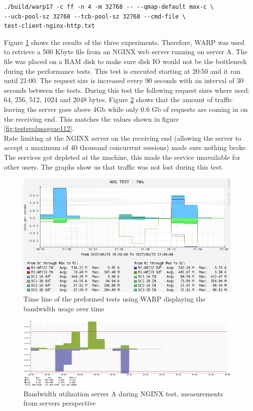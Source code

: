 \begin{verbatim}
./build/warp17 -c ff -n 4 -m 32768 -- --qmap-default max-c \
--ucb-pool-sz 32768 --tcb-pool-sz 32768 --cmd-file \
test-client-nginx-http.txt 
\end{verbatim} 

Figure \ref{fig:warptime} shows the results of the three experiments. 
Therefore, WARP was used to retrieve a 500 Kbyte file from an NGINX web server running on server A.
The file was placed on a RAM disk to make sure disk IO would not be the bottleneck during the performance tests. 
This test is executed starting at 20:50 and it ran until 21:00. The request size is increased every 90 seconds with an interval of 30 seconds between the tests.
During this test the following request sizes where used: 64, 256, 512, 1024 and 2048 bytes. 
Figure \ref{fig:realnginx} shows that the amount of traffic leaving the server goes above 4Gb while only 0.6 Gb of requests are coming in on the receiving end. 
This matches the values shown in figure \ref{fig:testrealusageae112}. \\
Rate limiting at the NGINX server on the receiving end (allowing the server to accept a maximum of 40 thousand concurrent sessions) made sure nothing broke. The services got depleted at the machine, this made the service unavailable for other users.
The graphs show us that traffic was not lost during this test.

\begin{figure}[]
  \includegraphics[scale=0.5]{images/warp-timeline.png}
  \caption{Time line of the preformed tests using WARP displaying the bandwidth usage over time}
  \label{fig:warptime}
\end{figure}

\begin{figure}
  \includegraphics[scale=0.35]{images/real-nginx.png}
  \caption{Bandwidth utilization server A during NGINX test, measurements from servers perspective }
  \label{fig:realnginx}
\end{figure}


